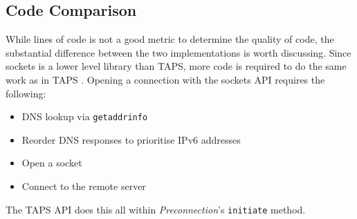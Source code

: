 \subsection{Code Comparison}\label{subsec:lines-of-code-comparison}
While lines of code is not a good metric to determine the quality of code, the substantial difference between the two
implementations is worth discussing.
Since sockets is a lower level library than TAPS, more code is required to do the same work as in TAPS .
Opening a connection with the sockets API requires the following:
\begin{itemize}
    \item DNS lookup via \texttt{getaddrinfo}
    \item Reorder DNS responses to prioritise IPv6 addresses
    \item Open a socket
    \item Connect to the remote server
\end{itemize}
The TAPS API does this all within \emph{Preconnection}'s \texttt{initiate} method.


